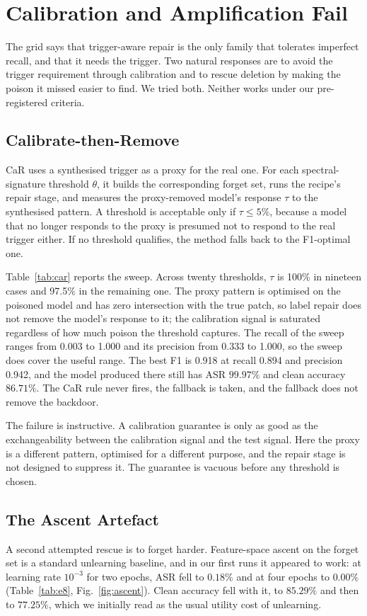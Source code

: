 \section{Calibration and Amplification Fail}
\label{sec:calib}

The grid says that trigger-aware repair is the only family that tolerates
imperfect recall, and that it needs the trigger. Two natural responses are to
avoid the trigger requirement through calibration and to rescue deletion by
making the poison it missed easier to find. We tried both. Neither works under
our pre-registered criteria.

\subsection{Calibrate-then-Remove}
CaR uses a synthesised trigger as a proxy for the real one. For each
spectral-signature threshold $\theta$, it builds the corresponding forget set,
runs the recipe's repair stage, and measures the proxy-removed model's response
$\tau$ to the synthesised pattern. A threshold is acceptable only if
$\tau\leq5\%$, because a model that no longer responds to the proxy is presumed
not to respond to the real trigger either. If no threshold qualifies, the method
falls back to the F1-optimal one.

Table~\ref{tab:car} reports the sweep. Across twenty thresholds, $\tau$ is
100\% in nineteen cases and 97.5\% in the remaining one. The proxy pattern is
optimised on the poisoned model and has zero intersection with the true patch, so
label repair does not remove the model's response to it; the calibration signal
is saturated regardless of how much poison the threshold captures. The recall of
the sweep ranges from 0.003 to 1.000 and its precision from 0.333 to 1.000, so
the sweep does cover the useful range. The best F1 is 0.918 at recall 0.894 and
precision 0.942, and the model produced there still has ASR $99.97\%$ and clean
accuracy $86.71\%$. The CaR rule never fires, the fallback is taken, and the
fallback does not remove the backdoor.

The failure is instructive. A calibration guarantee is only as good as the
exchangeability between the calibration signal and the test signal. Here the
proxy is a different pattern, optimised for a different purpose, and the repair
stage is not designed to suppress it. The guarantee is vacuous before any
threshold is chosen.



\subsection{The Ascent Artefact}
A second attempted rescue is to forget harder. Feature-space ascent on the forget
set is a standard unlearning baseline, and in our first runs it appeared to work:
at learning rate $10^{-3}$ for two epochs, ASR fell to $0.18\%$ and at four
epochs to $0.00\%$ (Table~\ref{tab:e8}, Fig.~\ref{fig:ascent}). Clean accuracy
fell with it, to $85.29\%$ and then to $77.25\%$, which we initially read as the
usual utility cost of unlearning.

